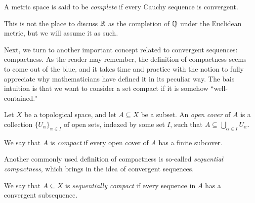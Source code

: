 \begin{definition}
	A metric space is said to be \emph{complete} if every Cauchy sequence is convergent.
\end{definition}

This is not the place to discuss $\mathbb R$ as the completion of $\mathbb Q$ under the Euclidean metric, but we will assume it as such.

Next, we turn to another important concept related to convergent sequences: compactness. As the reader may remember, the definition of compactness seems to come out of the blue, and it takes time and practice with the notion to fully appreciate why mathematicians have defined it in its peculiar way. The bais intuition is that we want to consider a set compact if it is somehow ``well-contained."

\begin{definition}
	Let $X$ be a topological space, and let $A \subseteq X$ be a subset. An \emph{open cover} of $A$ is a collection $\{U_{\alpha}\}_{\alpha \in I}$ of open sets, indexed by some set $I$, such that $A \subseteq \bigcup_{\alpha \in I}U_{\alpha}$.
	
	We say that $A$ is \emph{compact} if every open cover of $A$ has a finite subcover.
\end{definition}

Another commonly used definition of compactness is so-called \emph{sequential compactness}, which brings in the idea of convergent sequences.
\begin{definition}
	We say that $A \subseteq X$ is \emph{sequentially compact} if every sequence in $A$ has a convergent subsequence.
\end{definition}


